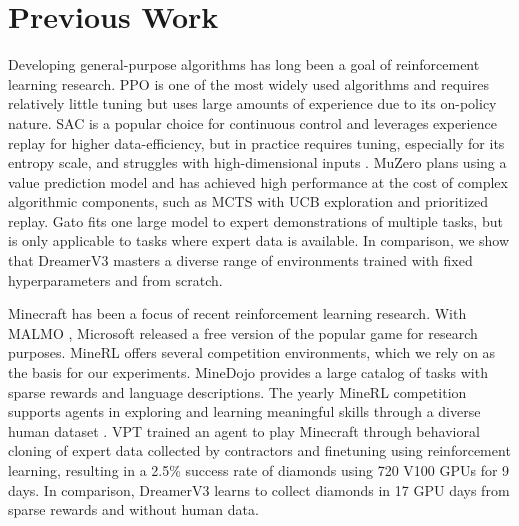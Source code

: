 \section*{Previous Work}
\label{sec:related}

Developing general-purpose algorithms has long been a goal of reinforcement learning research.
PPO \citep{schulman2017ppo} is one of the most widely used algorithms and requires relatively little tuning but uses large amounts of experience due to its on-policy nature.
SAC \citep{haarnoja2018sac} is a popular choice for continuous control and leverages experience replay for higher data-efficiency, but in practice requires tuning, especially for its entropy scale, and struggles with high-dimensional inputs \citep{yarats2019sacae}.
MuZero \citep{schrittwieser2019muzero} plans using a value prediction model and has achieved high performance at the cost of complex algorithmic components, such as MCTS with UCB exploration and prioritized replay.
Gato \citep{reed2022gato} fits one large model to expert demonstrations of multiple tasks, but is only applicable to tasks where expert data is available.
In comparison, we show that DreamerV3 masters a diverse range of environments trained with fixed hyperparameters and from scratch.

Minecraft has been a focus of recent reinforcement learning research. With MALMO \citep{johnson2016malmo}, Microsoft released a free version of the popular game for research purposes.
MineRL \citep{guss2019minerl} offers several competition environments, which we rely on as the basis for our experiments.
MineDojo \citep{fan2022minedojo} provides a large catalog of tasks with sparse rewards and language descriptions.
The yearly MineRL competition supports agents in exploring and learning meaningful skills through a diverse human dataset \citep{guss2019minerl}.
VPT \citep{baker2022vpt} trained an agent to play Minecraft through behavioral cloning of expert data collected by contractors and finetuning using reinforcement learning, resulting in a 2.5\% success rate of diamonds using 720 V100 GPUs for 9 days.
In comparison, DreamerV3 learns to collect diamonds in 17 GPU days from sparse rewards and without human data.

